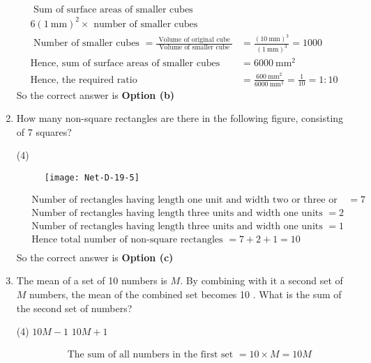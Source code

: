 \begin{enumerate}
\begin{answer}
\begin{align*}
\text{	Sum of surface areas of smaller cubes }&\\
\text{$6(1 \mathrm{~mm})^{2} \times$ number of smaller cubes}&\\
\text { Number of smaller cubes }=\frac{\text { Volume of original cube }}{\text { Volume of smaller cube }}&=\frac{(10 \mathrm{~mm})^{3}}{(1 \mathrm{~mm})^{3}}=1000\\
\text{Hence, sum of surface areas of smaller cubes }&=6000 \mathrm{~mm}^{2}\\
\text{Hence, the required ratio }&=\frac{600 \mathrm{~mm}^{2}}{6000 \mathrm{~mm}^{2}}=\frac{1}{10}=1: 10
	\end{align*}
		So the correct answer is \textbf{Option (b)}
\end{answer}
\item 	 How many non-square rectangles are there in the following figure, consisting of 7 squares?
 \begin{tasks}(4)
\end{tasks}
\begin{figure}[H]
	\centering
	\texttt{[image: Net-D-19-5]}
\end{figure}
\begin{answer}
	\begin{align*}
&\text{ Number of rectangles having length one unit and width two or three or four units $=7$}\\
&\text{	Number of rectangles having length three units and width one units $=2$}\\
&\text{	Number of rectangles having length three units and width one units $=1$}\\
&\text{	Hence total number of non-square rectangles $=7+2+1=10$}\\
	\end{align*}
	So the correct answer is \textbf{Option (c)}
\end{answer}
\item  The mean of a set of 10 numbers is $M$. By combining with it a second set of $M$ numbers, the mean of the combined set becomes 10 . What is the sum of the second set of numbers?
 \begin{tasks}(4)
	\task[\textbf{a.}]$10 M-1$
	\task[\textbf{b.}]$10 M+1$
\end{tasks}
\begin{answer}
	\begin{align*}
&\text{ The sum of all numbers in the first set }=10 \times M=10 M\\

\end{align*}
\end{answer}
\end{enumerate}
